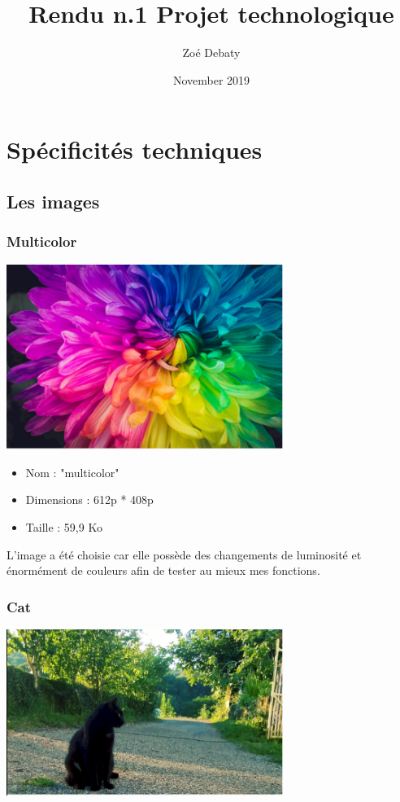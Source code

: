 \documentclass{article}
\title{Rendu n.1 Projet technologique}
\author{Zoé Debaty}
\date{November 2019}
\begin{document}
\maketitle
\tableofcontents 
\newpage

\section{Spécificités techniques}

\subsection{Les images}
\subsubsection{Multicolor}
\begin{center} 
    \includegraphics[width=9cm]{../Image_fonctions/Multicolor/Base.PNG}
\end{center}
\bigbreak

\begin{itemize}
\item Nom : "multicolor"
\item Dimensions : 612p * 408p
\item Taille : 59,9 Ko
\end{itemize}
\medbreak

L'image a été choisie car elle possède des changements de luminosité et énormément de couleurs afin de tester au mieux mes fonctions.

\subsubsection{Cat}
\begin{center} 
    \includegraphics[width=9cm]{../Image_fonctions/Cat/Base.PNG}
\end{center}
\bigbreak
\end{document}
